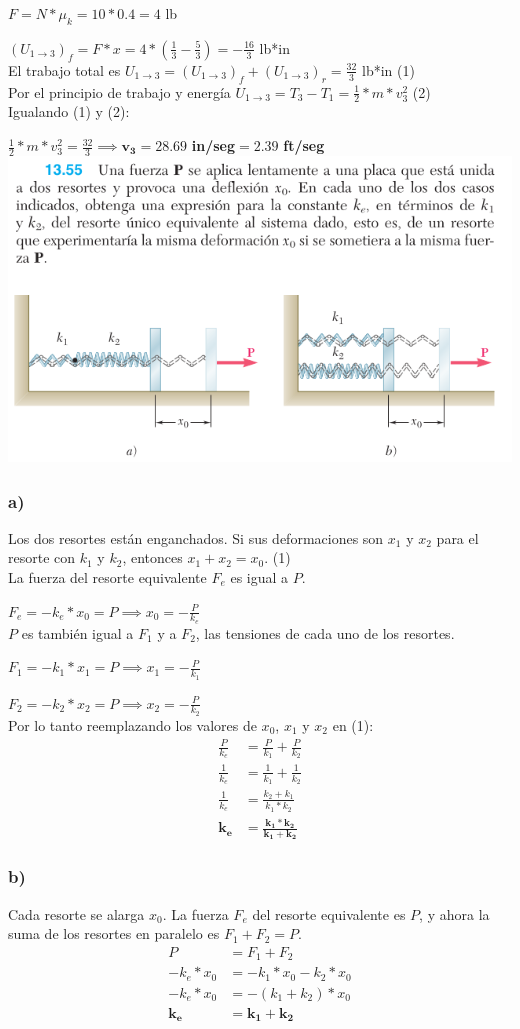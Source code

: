 \documentclass[12pt,fleqn]{article}
\begin{document}
$F=N*\mu_k=10*0.4=4$ lb

$(U_{1\rightarrow 3})_f=F*x=4*(\frac{1}{3}-\frac{5}{3})=-\frac{16}{3}$ lb*in\\

El trabajo total es $U_{1\rightarrow 3}=(U_{1\rightarrow 3})_f+(U_{1\rightarrow 3})_r=\frac{32}{3}$ lb*in (1)\\

Por el principio de trabajo y energía $U_{1\rightarrow 3}=T_3-T_1=\frac{1}{2}*m*v_3^2$ (2)\\

Igualando (1) y (2):

$\frac{1}{2}*m*v_3^2=\frac{32}{3}\implies \mathbf{v_3=28.69}$ \textbf{in/seg}$=\mathbf{2.39}$ \textbf{ft/seg}
\newpage
\includegraphics[width=\linewidth]{13.55}
\subsubsection*{a)}
Los dos resortes están enganchados. Si sus deformaciones son $x_1$ y $x_2$ para el resorte con $k_1$ y $k_2$, entonces $x_1+x_2=x_0$. (1)\\

La fuerza del resorte equivalente $F_e$ es igual a $P$.

$F_e=-k_e*x_0=P\implies x_0=-\frac{P}{k_e}$\\

$P$ es también igual a $F_1$ y a $F_2$, las tensiones de cada uno de los resortes.

$F_1=-k_1*x_1=P\implies x_1=-\frac{P}{k_1}$

$F_2=-k_2*x_2=P\implies x_2=-\frac{P}{k_2}$\\

Por lo tanto reemplazando los valores de $x_0$, $x_1$ y $x_2$ en (1):
\begin{align*}
  \frac{P}{k_e}&=\frac{P}{k_1}+\frac{P}{k_2}\\
  \frac{1}{k_e}&=\frac{1}{k_1}+\frac{1}{k_2}\\
  \frac{1}{k_e}&=\frac{k_2+k_1}{k_1*k_2}\\
  \mathbf{k_e}&=\mathbf{\frac{k_1*k_2}{k_1+k_2}}
\end{align*}
\subsubsection*{b)}
Cada resorte se alarga $x_0$. La fuerza $F_e$ del resorte equivalente es $P$, y ahora la suma de los resortes en paralelo es $F_1+F_2=P$.
\begin{align*}
  P&=F_1+F_2\\
  -k_e*x_0&=-k_1*x_0-k_2*x_0\\
  -k_e*x_0&=-(k_1+k_2)*x_0\\
  \mathbf{k_e}&\mathbf{=k_1+k_2}
\end{align*}
\end{document}
